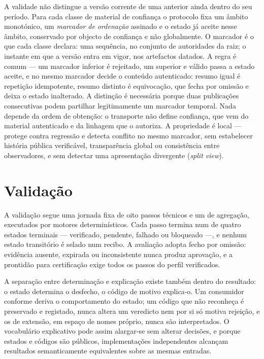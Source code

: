 \documentclass[journal abbreviation, manuscript]{copernicus}
\begin{document}
A validade não distingue a versão corrente de uma anterior ainda dentro do seu período. Para cada classe de material de confiança o protocolo fixa um âmbito monotónico, um \emph{marcador de ordenação} assinado e o estado já aceite nesse âmbito, conservado por objecto de confiança e não globalmente. O marcador é o que cada classe declara: uma sequência, no conjunto de autoridades da raiz; o instante em que a versão entra em vigor, nos artefactos datados. A regra é comum --- um marcador inferior é rejeitado, um superior e válido passa a estado aceite, e no mesmo marcador decide o conteúdo autenticado: resumo igual é repetição idempotente, resumo distinto é equivocação, que fecha por omissão e deixa o estado inalterado. A distinção é necessária porque duas publicações consecutivas podem partilhar legitimamente um marcador temporal. Nada depende da ordem de obtenção: o transporte não define confiança, que vem do material autenticado e da linhagem que o autoriza. A propriedade é local --- protege contra regressão e detecta conflito no mesmo marcador, sem estabelecer história pública verificável, transparência global ou consistência entre observadores, e sem detectar uma apresentação divergente (\emph{split view}).


\section{Validação}\label{sec:validation}

A validação segue uma jornada fixa de oito passos técnicos e um de agregação, executados por motores determinísticos. Cada passo termina num de quatro estados terminais --- verificado, pendente, falhado ou bloqueado ---, e nenhum estado transitório é selado num recibo. A avaliação adopta fecho por omissão: evidência ausente, expirada ou inconsistente nunca produz aprovação, e a prontidão para certificação exige todos os passos do perfil verificados.

A separação entre determinação e explicação existe também dentro do resultado: o estado determina o desfecho, o código de motivo explica-o. Um consumidor conforme deriva o comportamento do estado; um código que não reconheça é preservado e registado, nunca altera um veredicto nem por si só motiva rejeição, e os de extensão, em espaço de nomes próprio, nunca são interpretados. O vocabulário explicativo pode assim alargar-se sem alterar decisões, e porque estados e códigos são públicos, implementações independentes alcançam resultados semanticamente equivalentes sobre as mesmas entradas.
\end{document}
